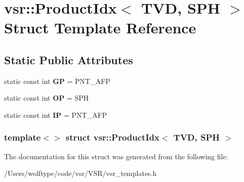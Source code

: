 \hypertarget{structvsr_1_1_product_idx_3_01_t_v_d_00_01_s_p_h_01_4}{\section{vsr\-:\-:Product\-Idx$<$ T\-V\-D, S\-P\-H $>$ Struct Template Reference}
\label{structvsr_1_1_product_idx_3_01_t_v_d_00_01_s_p_h_01_4}
}
\subsection*{Static Public Attributes}
\begin{DoxyCompactItemize}
\item 
\hypertarget{structvsr_1_1_product_idx_3_01_t_v_d_00_01_s_p_h_01_4_a9c24be99fdbb6b3a3268b8e9164382bc}{static const int {\bfseries G\-P} = P\-N\-T\-\_\-\-A\-F\-P}\label{structvsr_1_1_product_idx_3_01_t_v_d_00_01_s_p_h_01_4_a9c24be99fdbb6b3a3268b8e9164382bc}

\item 
\hypertarget{structvsr_1_1_product_idx_3_01_t_v_d_00_01_s_p_h_01_4_a33ba0b42350c5cfe82e2694eabd15b46}{static const int {\bfseries O\-P} = S\-P\-H}\label{structvsr_1_1_product_idx_3_01_t_v_d_00_01_s_p_h_01_4_a33ba0b42350c5cfe82e2694eabd15b46}

\item 
\hypertarget{structvsr_1_1_product_idx_3_01_t_v_d_00_01_s_p_h_01_4_ac3a4ecd7a0fb55537f13080614440777}{static const int {\bfseries I\-P} = P\-N\-T\-\_\-\-A\-F\-P}\label{structvsr_1_1_product_idx_3_01_t_v_d_00_01_s_p_h_01_4_ac3a4ecd7a0fb55537f13080614440777}

\end{DoxyCompactItemize}
\subsubsection*{template$<$$>$ struct vsr\-::\-Product\-Idx$<$ T\-V\-D, S\-P\-H $>$}



The documentation for this struct was generated from the following file\-:\begin{DoxyCompactItemize}
\item 
/\-Users/wolftype/code/vsr/\-V\-S\-R/vsr\-\_\-templates.\-h\end{DoxyCompactItemize}

